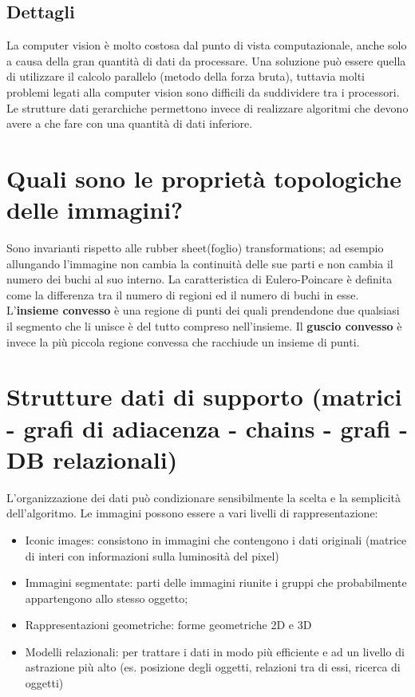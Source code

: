 \subsection{Dettagli}
La computer vision è molto costosa dal punto di vista computazionale, anche solo a causa della gran quantità di dati da processare. Una soluzione può essere quella di utilizzare il calcolo parallelo (metodo della forza bruta), tuttavia molti problemi legati alla computer vision sono difficili da suddividere tra i processori. Le strutture dati gerarchiche permettono invece di realizzare algoritmi che devono avere a che fare con una quantità di dati inferiore.

\section{Quali sono le proprietà topologiche delle immagini?}
Sono invarianti rispetto alle rubber sheet(foglio) transformations; ad esempio allungando l'immagine non cambia la continuità delle sue parti e non cambia il numero dei buchi al suo interno.
La caratteristica di Eulero-Poincare è definita come la differenza tra il numero di regioni ed il numero di buchi in esse.
L'\textbf{insieme convesso} è una regione di punti dei quali prendendone due qualsiasi il segmento che li unisce è del tutto compreso nell'insieme.
Il \textbf{guscio convesso} è invece la più piccola regione convessa che racchiude un insieme di punti.

\section{Strutture dati di supporto (matrici - grafi di adiacenza - chains - grafi - DB relazionali)}
L'organizzazione dei dati può condizionare sensibilmente la scelta e la semplicità dell'algoritmo. Le immagini possono essere a vari livelli di rappresentazione:
\begin{itemize}
	\item Iconic images: consistono in immagini che contengono i dati originali (matrice di interi con informazioni sulla luminosità del pixel)
	\item Immagini segmentate: parti delle immagini riunite i gruppi che probabilmente appartengono allo stesso oggetto;
	\item Rappresentazioni geometriche: forme geometriche 2D e 3D
	\item Modelli relazionali: per trattare i dati in modo più efficiente e ad un livello di astrazione più alto (es. posizione degli oggetti, relazioni tra di essi, ricerca di oggetti)
\end{itemize}